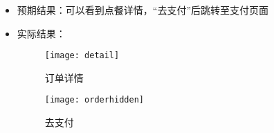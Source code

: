 \begin{enumerate}
\begin{itemize}
              \item {预期结果}：可以看到点餐详情，“去支付”后跳转至支付页面
              \item {实际结果}：
                    \begin{figure}[htbp]
                        \centering
                        \begin{minipage}{0.35\textwidth}
                            \centering
                            \texttt{[image: detail]}
                            \caption{订单详情}\label{fig:detail}
                        \end{minipage}
                        \begin{minipage}{0.35\textwidth}
                            \centering
                            \texttt{[image: orderhidden]}
                            \caption{去支付}\label{fig:orderhidden}
                        \end{minipage}
                        \vspace{\baselineskip}
                    \end{figure}
          \end{itemize}


\end{enumerate}
